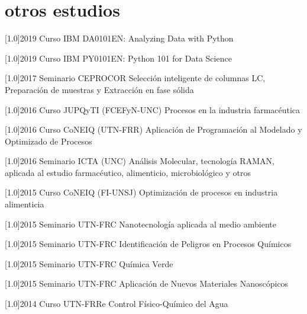 \documentclass[espanol]{cv-style}     %
\begin{document}
\section{otros estudios}
  \vspace{-0.2cm}
\begin{entrylist}

\entry
{\scalebox{.8}[1.0]{2019}}
{Curso}
{IBM}
{\small{DA0101EN: Analyzing Data with Python}}

\entry
{\scalebox{.8}[1.0]{2019}}
{Curso}
{IBM}
{\small{PY0101EN: Python 101 for Data Science}}

\entry
{\scalebox{.8}[1.0]{2017}}
{Seminario}
{CEPROCOR}
{\small{Selección inteligente de columnas LC, Preparación de muestras y Extracción en fase sólida}}

\entry
{\scalebox{.8}[1.0]{2016}}
{Curso}
{JUPQyTI (FCEFyN-UNC)}
{\small{Procesos en la industria farmacéutica}}

\entry
{\scalebox{.8}[1.0]{2016}}
{Curso}
{CoNEIQ (UTN-FRR)}
{\small{Aplicación de Programación al Modelado y Optimizado de Procesos}}

\entry
{\scalebox{.8}[1.0]{2016}}
{Seminario}
{ICTA (UNC)}
{\small{Análisis Molecular, tecnología RAMAN, aplicada al estudio farmacéutico, alimenticio, microbiológico y otros}}

\entry
{\scalebox{.8}[1.0]{2015}}
{Curso}
{CoNEIQ (FI-UNSJ)}
{\small{Optimización de procesos en industria alimenticia}}

\entry
{\scalebox{.8}[1.0]{2015}}
{Seminario}
{UTN-FRC}
{\small{Nanotecnología aplicada al medio ambiente}}

\entry
{\scalebox{.8}[1.0]{2015}}
{Seminario}
{UTN-FRC}
{\small{Identificación de Peligros en Procesos Químicos}}

\entry
{\scalebox{.8}[1.0]{2015}}
{Seminario}
{UTN-FRC}
{\small{Química Verde}}

\entry
{\scalebox{.8}[1.0]{2015}}
{Seminario}
{UTN-FRC}
{\small{Aplicación de Nuevos Materiales Nanoscópicos}}

\entry
{\scalebox{.8}[1.0]{2014}}
{Curso}
{UTN-FRRe}
{Control Físico-Químico del Agua}

\end{entrylist}
 

\end{document}
